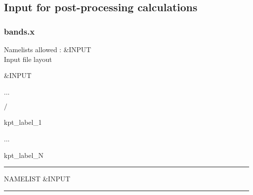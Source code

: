 \subsection{Input for post-processing calculations}
\subsubsection{bands.x}
\noindent Namelists allowed : \&INPUT\\
\noindent Input file layout
\begin{description}
  \item \&INPUT
  \item ...
  \item $/$
  \item kpt\_label\_1
  \item ...
  \item kpt\_label\_N
\end{description}

\begin{centering}
\rule{2.2in}{0.01in} NAMELIST \&INPUT \rule{2.2in}{0.01in}
\end{centering}\\

